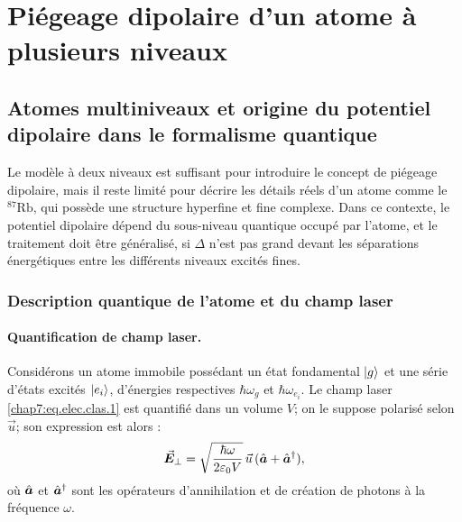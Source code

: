 \section{Piégeage dipolaire d’un atome à plusieurs niveaux}

\subsection{Atomes multiniveaux et origine du potentiel dipolaire dans le formalisme quantique}\label{sec.7.3.1}

Le modèle à deux niveaux est suffisant pour introduire le concept de piégeage dipolaire, mais il reste limité pour décrire les détails réels d'un atome comme le \({}^{87}\mathrm{Rb}\), qui possède une structure hyperfine et fine complexe. Dans ce contexte, le potentiel dipolaire dépend du sous-niveau quantique occupé par l’atome, et le traitement doit être généralisé, si \( \Delta \) n'est pas grand devant les séparations énergétiques entre les différents niveaux excités fines.

\subsubsection{Description quantique de l’atome et du champ laser}

\paragraph{Quantification de champ laser.}

Considérons un atome immobile possédant un état fondamental \( \ket{g} \) et une série d’états excités \( \ket{e_i} \), d’énergies respectives \( \hbar\omega_g \) et \( \hbar\omega_{e_i} \). Le champ laser \eqref{chap7:eq.elec.clas.1} est quantifié dans un volume \( V \); on le suppose polarisé selon \( \vec{u} \);  son expression \cite{CohenTannoudji1988} est alors :
\begin{eqnarray}\label{chap7:eq.elec.quat.1}
	\vec{{\bm{E}}}_\perp = \sqrt{\frac{\hbar \omega}{2\varepsilon_0 V}} \, \vec{u} \, (\hat{\bm{a}} + \hat{\bm{a}}^\dagger),	
\end{eqnarray}
où \( \hat{\bm{a}} \) et \( \hat{\bm{a}}^\dagger \) sont les opérateurs d’annihilation et de création de photons à la fréquence \( \omega \).

